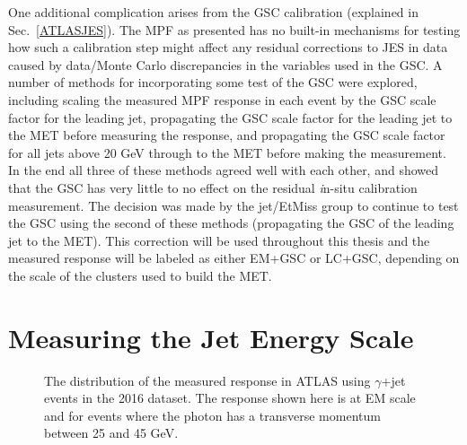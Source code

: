 One additional complication arises from the GSC calibration (explained in Sec.~\ref{ATLASJES}).  
The MPF as presented has no built-in mechanisms for testing how such a calibration step might affect any residual corrections to JES in data caused by data/Monte Carlo discrepancies in the variables used in the GSC.  
A number of methods for incorporating some test of the GSC were explored, including scaling the measured MPF response in each event by the GSC scale factor for the leading jet, propagating the GSC scale factor for the leading jet to the MET before measuring the response, and propagating the GSC scale factor for all jets above 20 GeV through to the MET before making the measurement.  
In the end all three of these methods agreed well with each other, and showed that the GSC has very little to no effect on the residual {\textit in-situ} calibration measurement.  
The decision was made by the jet/EtMiss group to continue to test the GSC using the second of these methods (propagating the GSC of the leading jet to the MET).  
This correction will be used throughout this thesis and the measured response will be labeled as either EM+GSC or LC+GSC, depending on the scale of the clusters used to build the MET.  


\section{Measuring the Jet Energy Scale}
\label{MeasureJES}
\begin{figure}[!ht]
\begin{center}
\end{center}
\caption[Example response distribution]
{\small The distribution of the measured response in ATLAS using $\gamma$+jet events in the 2016 dataset.  The response shown here is at EM scale and for events where the photon has a transverse momentum between 25 and 45 GeV. }
\label{ExampleRespDist}
\end{figure}


